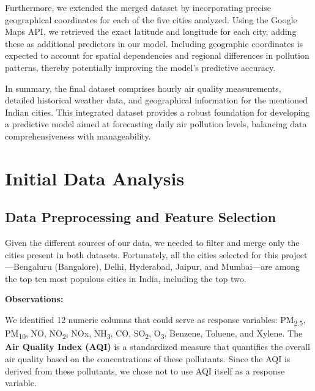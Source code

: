 \documentclass[12pt]{article}
\begin{document}
Furthermore, we extended the merged dataset by incorporating precise geographical coordinates for each of the five cities analyzed. Using the Google Maps API, we retrieved the exact latitude and longitude for each city, adding these as additional predictors in our model. Including geographic coordinates is expected to account for spatial dependencies and regional differences in pollution patterns, thereby potentially improving the model's predictive accuracy.

In summary, the final dataset comprises hourly air quality measurements, detailed historical weather data, and geographical information for the mentioned Indian cities. This integrated dataset provides a robust foundation for developing a predictive model aimed at forecasting daily air pollution levels, balancing data comprehensiveness with manageability.

\newpage




\section{Initial Data Analysis}

\subsection{Data Preprocessing and Feature Selection}

Given the different sources of our data, we needed to filter and merge only the cities present in both datasets. Fortunately, all the cities selected for this project---Bengaluru (Bangalore), Delhi, Hyderabad, Jaipur, and Mumbai---are among the top ten most populous cities in India, including the top two.

\textbf{Observations:}

We identified 12 numeric columns that could serve as response variables: PM\textsubscript{2.5}, PM\textsubscript{10}, NO, NO\textsubscript{2}, NOx, NH\textsubscript{3}, CO, SO\textsubscript{2}, O\textsubscript{3}, Benzene, Toluene, and Xylene. The \textbf{Air Quality Index (AQI)} is a standardized measure that quantifies the overall air quality based on the concentrations of these pollutants. Since the AQI is derived from these pollutants, we chose not to use AQI itself as a response variable.
\end{document}
